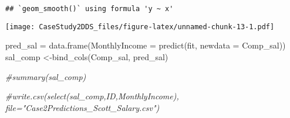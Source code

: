 \documentclass[
]{article}
\newenvironment{Shaded}{\begin{snugshade}}{\end{snugshade}}
\newcommand{\AttributeTok}[1]{\textcolor[rgb]{0.77,0.63,0.00}{#1}}
\newcommand{\CommentTok}[1]{\textcolor[rgb]{0.56,0.35,0.01}{\textit{#1}}}
\newcommand{\FunctionTok}[1]{\textcolor[rgb]{0.00,0.00,0.00}{#1}}
\newcommand{\NormalTok}[1]{#1}
\newcommand{\OtherTok}[1]{\textcolor[rgb]{0.56,0.35,0.01}{#1}}
\begin{document}
\begin{verbatim}
## `geom_smooth()` using formula 'y ~ x'
\end{verbatim}

\texttt{[image: CaseStudy2DDS\_files/figure-latex/unnamed-chunk-13-1.pdf]}

\begin{Shaded}
\begin{Highlighting}[]
\NormalTok{pred\_sal }\OtherTok{=} \FunctionTok{data.frame}\NormalTok{(}\AttributeTok{MonthlyIncome =} \FunctionTok{predict}\NormalTok{(fit, }\AttributeTok{newdata =}\NormalTok{ Comp\_sal))}
\NormalTok{sal\_comp }\OtherTok{\textless{}{-}}\FunctionTok{bind\_cols}\NormalTok{(Comp\_sal, pred\_sal)}

\CommentTok{\#summary(sal\_comp)}

\CommentTok{\#write.csv(select(sal\_comp,ID,MonthlyIncome), file="Case2Predictions\_Scott\_Salary.csv")}
\end{Highlighting}
\end{Shaded}
\end{document}
